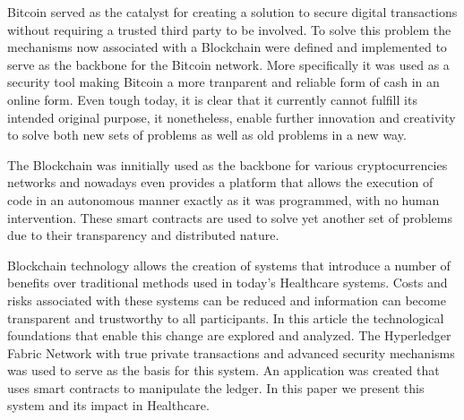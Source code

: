 \begin{tueABSTRACT}

  Bitcoin served as the catalyst for creating a solution to secure digital
  transactions without requiring a trusted third party to be involved. To solve
  this problem the mechanisms now associated with a Blockchain were defined and
  implemented to serve as the backbone for the Bitcoin network. More
  specifically it was used as a security tool making Bitcoin a more tranparent
  and reliable form of cash in an online form. Even tough today, it is clear
  that it currently cannot fulfill its intended original purpose, it
  nonetheless, enable further innovation and creativity to solve both new sets
  of problems as well as old problems in a new way.

  The Blockchain was innitially used as the backbone for various
  cryptocurrencies networks and nowadays even provides a platform that allows the 
  execution of code in an autonomous manner exactly as it was programmed, with
  no human intervention. These smart contracts are used to solve yet another set of
  problems due to their transparency and distributed nature. 

  Blockchain technology allows the creation of systems that introduce a number of
  benefits over traditional methods used in today's Healthcare systems.  Costs
  and risks associated with these systems can be reduced and information can
  become transparent and trustworthy to all participants. In this article the
  technological foundations that enable this change are explored and analyzed.
  The Hyperledger Fabric Network with true private transactions and advanced
  security mechanisms was used to serve as the basis for this system.  An
  application was created that uses smart contracts to manipulate the ledger. In
  this paper we present this system and its impact in Healthcare.

\end{tueABSTRACT}
